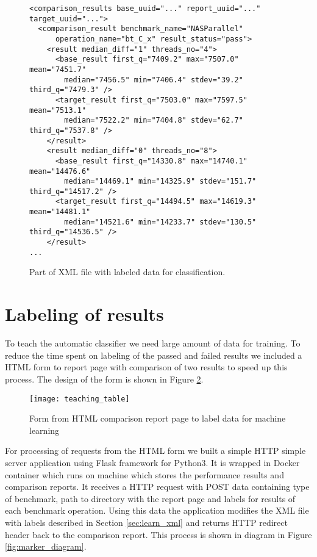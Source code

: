 \begin{figure}
  \small
  \begin{verbatim}
<comparison_results base_uuid="..." report_uuid="..." target_uuid="...">
  <comparison_result benchmark_name="NASParallel"
      operation_name="bt_C_x" result_status="pass">
    <result median_diff="1" threads_no="4">
      <base_result first_q="7409.2" max="7507.0" mean="7451.7"
        median="7456.5" min="7406.4" stdev="39.2" third_q="7479.3" />
      <target_result first_q="7503.0" max="7597.5" mean="7513.1"
        median="7522.2" min="7404.8" stdev="62.7" third_q="7537.8" />
    </result>
    <result median_diff="0" threads_no="8">
      <base_result first_q="14330.8" max="14740.1" mean="14476.6"
        median="14469.1" min="14325.9" stdev="151.7" third_q="14517.2" />
      <target_result first_q="14494.5" max="14619.3" mean="14481.1"
        median="14521.6" min="14233.7" stdev="130.5" third_q="14536.5" />
    </result>
...
  \end{verbatim}
  \normalsize
  \caption{Part of XML file with labeled data for classification.}
  \label{fig:learn_xml}
\end{figure}

\section{Labeling of results}
To teach the automatic classifier we need large amount of data for training. To
reduce the time spent on labeling of the passed and failed results we included a
HTML form to report page with comparison of two results to speed up this
process. The design of the form is shown in Figure \ref{fig:label_form}.

\begin{figure}
  \centering
  \texttt{[image: teaching\_table]}
  \caption{Form from HTML comparison report page to label data for machine learning}
  \label{fig:label_form}
\end{figure}

For processing of requests from the HTML form we built a simple HTTP simple
server application using Flask framework for Python3. It is wrapped in Docker
container which runs on machine which stores the performance results and
comparison reports. It receives a HTTP request with POST data containing type of
benchmark, path to directory with the report page and labels for results of each
benchmark operation. Using this data the application modifies the XML file with
labels described in Section \ref{sec:learn_xml} and returns HTTP redirect header
back to the comparison report. This process is shown in diagram in Figure
\ref{fig:marker_diagram}.

